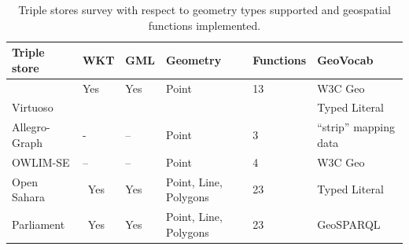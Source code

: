 \documentclass[a4paper,11pt]{report}
\begin{document}
\begin{table}
 \begin{tabularx}{\textwidth}{|X|X|X|X|X|l|}
 \hline
 \textbf{Triple store} & WKT & GML & Geometry   & Functions &     GeoVocab \\ \hline
                                   
  & Yes & Yes & Point & 13 & W3C Geo   \\ 
  Virtuoso  &       &       &          &                      &  Typed Literal  \\ \hline
 Allegro-Graph & \-- & -- & Point & 3  & ``strip'' mapping data \\ \hline
 OWLIM-SE & -- & -- & Point & 4 & W3C Geo\\ \hline
 Open Sahara & \ Yes & Yes & Point, Line, Polygons & 23  & Typed Literal \\ \hline
 Parliament & \ Yes & Yes & Point, Line, Polygons & 23   &  GeoSPARQL \\ \hline
 \end{tabularx}
\caption{Triple stores survey with respect to geometry types supported and geospatial functions implemented.}
\label{tab:triplestore}
\end{table}



 
\end{document}
